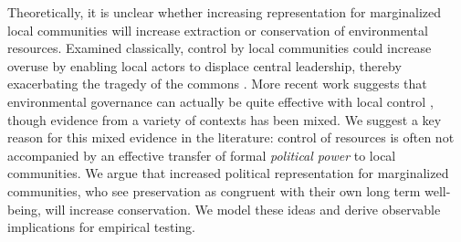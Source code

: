 \documentclass[12pt,reqno]{article}
\begin{document}

Theoretically, it is unclear whether increasing representation for marginalized local communities will increase extraction or conservation of environmental resources. Examined classically, control by local communities could increase overuse by enabling local actors to displace central leadership, thereby exacerbating the tragedy of the commons \parencite{hardin1968tragedy}. More recent work suggests that environmental governance can actually be quite effective with local control \parencite{ostrom1990governing}, though evidence from a variety of contexts has been mixed. We suggest a key reason for this mixed evidence in the literature: control of resources is often not accompanied by an effective transfer of formal \emph{political power} to local communities. We argue that increased political representation for marginalized communities, who see preservation as congruent with their own long term well-being, will increase conservation. We model these ideas and derive observable implications for empirical testing.


\end{document}

